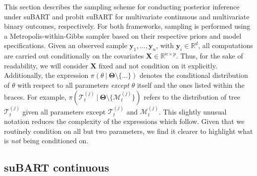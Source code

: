 \documentclass[aoas,preprint]{imsart}
\newcommand\given[1][]{\:#1\vert\:}
\theoremstyle{plain}
\theoremstyle{definition}
\theoremstyle{remark}
\begin{document}
This section describes the sampling scheme for conducting posterior inference under suBART and probit suBART for multivariate continuous and multivariate binary outcomes, respectively. For both frameworks, sampling is performed using a Metropolis-within-Gibbs sampler based on their respective priors and model specifications. Given an observed sample $\mathbf{y}_{1}, \ldots, \mathbf{y}_n$, with $\mathbf{y}_{i} \in \mathbb{R}^{d}$, all computations are carried out conditionally on the covariates $\mathbf{X} \in \mathbb{R}^{n\times p}$. Thus, for the sake of readability, we will consider $\mathbf{X}$ fixed and not condition on it explicitly. Additionally, the expression $\pi(\theta\given \boldsymbol{\Theta}\setminus\{\ldots\})$ denotes the conditional distribution of $\theta$ with respect to all parameters \textit{except} $\theta$ itself and the ones listed within the braces. For example, $\pi(\mathcal{T}^{(j)}_t\given \boldsymbol{\Theta}\setminus\{\mathcal{M}^{(j)}_t\})$ refers to the distribution of tree $\mathcal{T}^{(j)}_t$ given all parameters except $\mathcal{T}^{(j)}_t$ and $\mathcal{M}^{(j)}_t$. This slightly unusual notation reduces the complexity of the expressions which follow. Given that we routinely condition on all but two parameters, we find it clearer to highlight what is \textit{not} being conditioned on.

\subsection{suBART continuous}\label{sec:post_subart}
\end{document}
